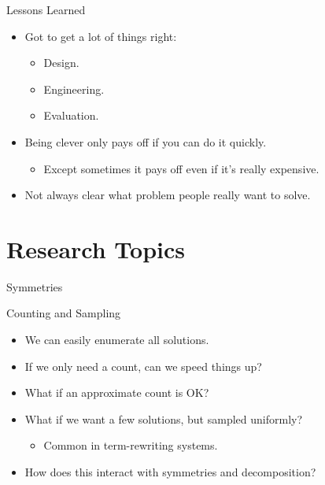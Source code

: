 \documentclass[aspectratio=169,compress,10pt]{beamer}
\begin{document}
\begin{frame}{Lessons Learned}
    \begin{itemize}
        \item Got to get a lot of things right:
            \begin{itemize}
                \item Design.
                \item Engineering.
                \item Evaluation.
            \end{itemize}
        \item Being clever only pays off if you can do it quickly.
            \begin{itemize}
                \item Except sometimes it pays off even if it's really expensive.
            \end{itemize}
        \item Not always clear what problem people really want to solve.
    \end{itemize}
\end{frame}

\section{Research Topics}

\begin{frame}{Symmetries}
\end{frame}

\begin{frame}{Counting and Sampling}
    \begin{itemize}
        \item We can easily enumerate all solutions.
        \item If we only need a count, can we speed things up?
        \item <2-> What if an approximate count is OK?
        \item <3-> What if we want a few solutions, but sampled uniformly?
            \begin{itemize}
                \item Common in term-rewriting systems.
            \end{itemize}
        \item <4-> How does this interact with symmetries and decomposition?
    \end{itemize}
\end{frame}
\end{document}
